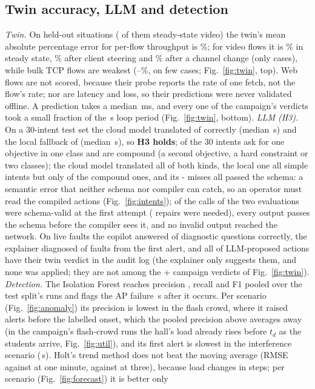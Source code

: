\documentclass[conference]{IEEEtran}
\begin{document}
\subsection{Twin accuracy, LLM and detection}
\emph{Twin.} On \TwinN{} held-out situations (\TwinSteadyN{} of them steady-state video) the twin's mean absolute percentage error for per-flow throughput is \TwinMape\%; for video flows it is \TwinSteadyVideo\% in steady state, \TwinSteer\% after client steering and \TwinChannel\% after a channel change (only \TwinChannelN{} cases), while bulk TCP flows are weakest (\TwinBulkLow--\TwinBulkHigh\%, on few cases; Fig.~\ref{fig:twin}, top). Web flows are not scored, because their probe reports the rate of one fetch, not the flow's rate; nor are latency and loss, so their predictions were never validated offline. A prediction takes a median \SimMedianMs\,ms, and every one of the campaign's verdicts took a small fraction of the \CfgPeriod\,s loop period (Fig.~\ref{fig:twin}, bottom). \emph{LLM (H3).} On a 30-intent test set the cloud model translated \IntCloudOk{} of \IntCases{} correctly (median \IntCloudSeconds\,s) and the local fallback \IntLocalOk{} of \IntCases{} (median \IntLocalSeconds\,s), so \textbf{H3 holds}; of the 30 intents \IntSimple{} ask for one objective in one class and \IntCompound{} are compound (a second objective, a hard constraint or two classes); the cloud model translated all of both kinds, the local one all \IntLocalSimpleOk{} simple intents but only \IntLocalCompoundOk{} of the compound ones, and its \the\numexpr\IntCases-\IntLocalOk\relax{} misses all passed the schema: a semantic error that neither schema nor compiler can catch, so an operator must read the compiled actions (Fig.~\ref{fig:intents}); \IntFirstValid{} of the \IntCalls{} calls of the two evaluations were schema-valid at the first attempt (\IntRepairs{} repairs were needed), every output passes the schema before the compiler sees it, and no invalid output reached the network. On live faults the copilot answered \GenCopilotOk{} of \GenCopilotN{} diagnostic questions correctly, the explainer diagnosed \GenRcaOk{} of \GenRcaN{} faults from the first alert, and all \GenActionsVerdict{} of \GenActions{} LLM-proposed actions have their twin verdict in the audit log (the explainer only suggests them, and none was applied; they are not among the \the\numexpr\LedVtwoProposed+\LedVthreeProposed\relax{} campaign verdicts of Fig.~\ref{fig:twin}). \emph{Detection.} The Isolation Forest reaches precision \AnoPrecision, recall \AnoRecall{} and F1 \AnoF{} pooled over the test split's runs and flags the AP failure \AnoDelayFail\,s after it occurs. Per scenario (Fig.~\ref{fig:anomaly}) its precision is lowest in the flash crowd, where it raised \AnoFalseFlash{} alerts before the labelled onset, which the pooled precision above averages away (in the campaign's flash-crowd runs the hall's load already rises before $t_d$ as the students arrive, Fig.~\ref{fig:util}), and its first alert is slowest in the interference scenario (\AnoDelayCochan\,s). Holt's trend method does not beat the moving average (RMSE \FcHoltOne{} against \FcMaOne{} at one minute, \FcHoltThree{} against \FcMaThree{} at three), because load changes in steps; per scenario (Fig.~\ref{fig:forecast}) it is better only 
\end{document}
